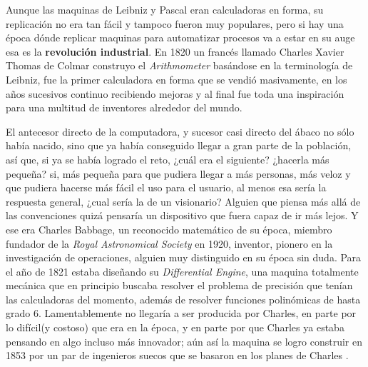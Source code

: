 \documentclass[letterpaper,12pt,oneside]{book}
\begin{document}
		Aunque las maquinas de Leibniz y Pascal eran calculadoras en forma, su replicación no era tan fácil y tampoco fueron muy populares, pero
		si hay una época dónde replicar maquinas para automatizar procesos va a estar en su auge esa es la \textbf{revolución industrial}. En
		1820 un francés llamado Charles Xavier Thomas de Colmar construyo el \textit{Arithmometer} basándose en la terminología de Leibniz, fue la primer
		calculadora en forma que se vendió masivamente, en los años sucesivos continuo recibiendo mejoras y al final fue toda una inspiración para una multitud de inventores 
		alrededor del mundo\cite[p. 127]{ifrah_universal_2001}.
		
		El antecesor directo de la computadora, y sucesor casi directo del ábaco no sólo había nacido, sino que ya había conseguido llegar a gran parte de
		la población, así que, si ya se había logrado el reto, ¿cuál era el siguiente? ¿hacerla más pequeña? si, más pequeña para que pudiera llegar a más personas,
		más veloz y que pudiera hacerse más fácil el uso para el usuario, al menos esa sería la respuesta general, ¿cual sería la de un visionario? Alguien
		que piensa más allá de las convenciones quizá pensaría un dispositivo que fuera capaz de ir más lejos. Y ese era Charles 
		Babbage,
		un reconocido matemático de su época, miembro fundador de la \textit{Royal Astronomical Society} en 1920, inventor, pionero en la investigación
		de operaciones, alguien muy distinguido en su época sin duda. Para el año de 1821 estaba diseñando su \textit{Differential Engine}, una maquina totalmente mecánica que
		en principio buscaba resolver el problema de precisión que tenían las calculadoras del momento, además de resolver funciones polinómicas de hasta
		grado 6. Lamentablemente no llegaría a ser producida por Charles, en parte por lo difícil(y costoso) que era en la época, y en parte por que Charles ya estaba pensando 
		en algo incluso más innovador; aún así la maquina se logro construir en 1853 por un par de ingenieros suecos que se basaron en los planes de Charles
		\cite[p.201]{oregan_brief_2012}.
		
\end{document}
